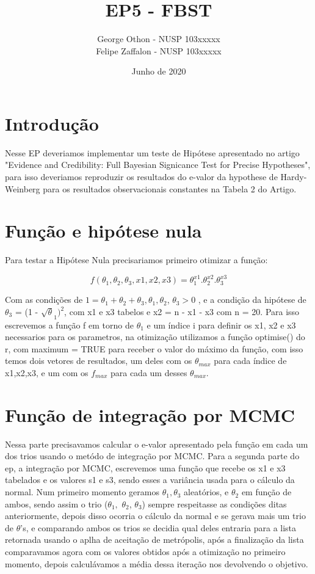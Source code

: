 \documentclass{article}
\title{EP5 - FBST}
\author{George Othon - NUSP 103xxxxx 
        \\ Felipe Zaffalon - NUSP 103xxxxx}
\date{Junho de 2020}
\begin{document}
\maketitle

\section{Introdução}
Nesse EP deveriamos implementar um teste de Hipótese apresentado no artigo "Evidence and
Credibility: Full Bayesian Signicance Test for Precise Hypotheses", para isso deveriamos reproduzir os resultados do e-valor da hypothese de Hardy-Weinberg para os resultados observacionais
constantes na Tabela 2 do Artigo.

\section{Função e hipótese nula}
Para testar a Hipótese Nula precisariamos primeiro otimizar a função:

$$ f(\theta_1, \theta_2, \theta_3, x1, x2, x3) = \theta_1^{x1}.\theta_2^{x2}.\theta_3^{x3}
$$

\hfill

\par Com as condições de $1 = \theta_1+\theta_2+\theta_3, \theta_1, \theta_2$, $\theta_3 > 0$ , e a condição da hipótese de $\theta_3$ = (1 - $ \sqrt\theta_1)^2$,
com x1 e x3 tabelos e x2 = n - x1 - x3 com n = 20. Para isso escrevemos a função f em torno de $\theta_1$
e um índice i para definir os x1, x2 e x3 necessarios para os parametros, na otimização utilizamos a função optimise() do r, com maximum = TRUE para receber o valor do máximo da função, com isso temos dois vetores de resultados, um deles com os $\theta_{max}$ para cada índice de x1,x2,x3, e
um com os $f_{max}$ para cada um desses $\theta_{max}$.

\section{Função de integração por MCMC}
Nessa parte precisavamos calcular o e-valor apresentado pela função em cada um dos trios usando
o metódo de integração por MCMC.
Para a segunda parte do ep, a integração por MCMC, escrevemos uma função que recebe os x1 e
x3 tabelados e os valores s1 e s3, sendo esses a variância usada para o cálculo da normal. Num
primeiro momento geramos $\theta_1, \theta_3$ aleatórios, e $\theta_2$ em função de ambos, sendo assim o trio ($\theta_1,$ $\theta_2$, $\theta_3$)
sempre respeitasse as condições ditas anteriormente, depois disso ocorria o cálculo
da normal e se gerava mais um trio de $\theta$'s, e comparando ambos os trios se decidia qual deles
entraria para a lista retornada usando o aplha de aceitação de metrópolis, após a finalização da
lista comparavamos agora com os valores obtidos após a otimização no primeiro momento, depois
calculávamos a média dessa iteração nos devolvendo o objetivo.
\end{document}
